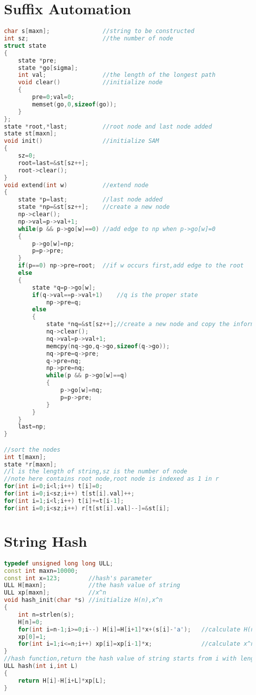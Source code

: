  \section{Suffix Automation}
 \begin{lstlisting}[language=C++]
char s[maxn];               //string to be constructed
int sz;                     //the number of node
struct state
{  
    state *pre;
    state *go[sigma];
    int val;                //the length of the longest path
    void clear()            //initialize node
    {  
        pre=0;val=0;  
        memset(go,0,sizeof(go));  
    }  
};  
state *root,*last;          //root node and last node added
state st[maxn];  
void init()                 //initialize SAM
{  
    sz=0;  
    root=last=&st[sz++];  
    root->clear();  
}  
void extend(int w)          //extend node
{  
    state *p=last;          //last node added
    state *np=&st[sz++];    //create a new node
    np->clear();
    np->val=p->val+1;  
    while(p && p->go[w]==0) //add edge to np when p->go[w]=0
    {  
        p->go[w]=np;  
        p=p->pre;  
    }  
    if(p==0) np->pre=root;  //if w occurs first,add edge to the root
    else  
    {  
        state *q=p->go[w];  
        if(q->val==p->val+1)    //q is the proper state
            np->pre=q;  
        else  
        {  
            state *nq=&st[sz++];//create a new node and copy the information
            nq->clear();  
            nq->val=p->val+1;  
            memcpy(nq->go,q->go,sizeof(q->go));  
            nq->pre=q->pre;  
            q->pre=nq;
            np->pre=nq;  
            while(p && p->go[w]==q)
            {  
                p->go[w]=nq;  
                p=p->pre;  
            }  
        }  
    }  
    last=np;  
}

//sort the nodes
int t[maxn];
state *r[maxn];
//l is the length of string,sz is the number of node
//note here contains root node,root node is indexed as 1 in r
for(int i=0;i<l;i++) t[i]=0;
for(int i=0;i<sz;i++) t[st[i].val]++;
for(int i=1;i<l;i++) t[i]+=t[i-1];
for(int i=0;i<sz;i++) r[t[st[i].val]--]=&st[i];
 \end{lstlisting}

 \section{String Hash}
 \begin{lstlisting}[language=C++]
typedef unsigned long long ULL;
const int maxn=10000;
const int x=123;        //hash's parameter
ULL H[maxn];            //the hash value of string
ULL xp[maxn];           //x^n
void hash_init(char *s) //initialize H(n),x^n
{
    int n=strlen(s);
    H[n]=0;
    for(int i=n-1;i>=0;i--) H[i]=H[i+1]*x+(s[i]-'a');   //calculate H(n)
    xp[0]=1;
    for(int i=1;i<=n;i++) xp[i]=xp[i-1]*x;              //calculate x^n
}
//hash function,return the hash value of string starts from i with length of L
ULL hash(int i,int L)
{
    return H[i]-H[i+L]*xp[L];
}
 \end{lstlisting}

